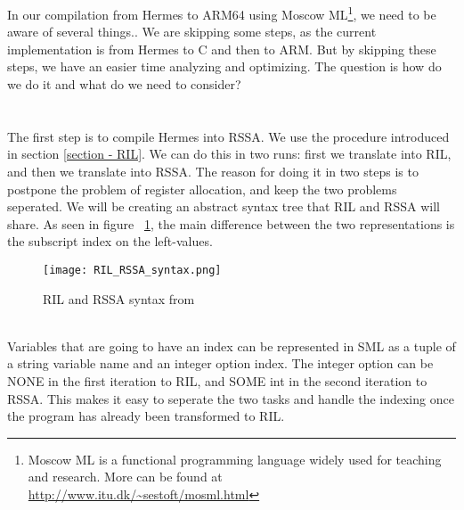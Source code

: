 In our compilation from Hermes to ARM64 using Moscow ML\footnote{Moscow ML is a functional programming language widely used for teaching and research. More can be found at \url{http://www.itu.dk/~sestoft/mosml.html}}, we need to be aware of several things..
We are skipping some steps, as the current implementation is from Hermes to C and then to ARM.
But by skipping these steps, we have an easier time analyzing and optimizing. The question is how do we do it and what do we need to consider?

\section{}
The first step is to compile Hermes into RSSA. We use the procedure introduced in section \ref{section - RIL}.
We can do this in two runs: first we translate into RIL, and then we translate into RSSA.
The reason for doing it in two steps is to postpone the problem of register allocation, and keep the two problems seperated.
We will be creating an abstract syntax tree that RIL and RSSA will share.
As seen in figure ~\ref{fig:RIL vs RSSA}, the main difference between the two representations is the subscript index on the left-values.
\begin{figure}[htp]
  \begin{center}
    \texttt{[image: RIL\_RSSA\_syntax.png]}
  \end{center}
  \caption[caption]{RIL and RSSA syntax from\cite{10.1007/978-3-319-41579-6_16}}
  \label{fig:RIL vs RSSA}
\end{figure} \\
Variables that are going to have an index can be represented in SML as a tuple of a string variable name and an integer option index. The integer option can be NONE in the first iteration to RIL, and SOME int in the second iteration to RSSA. This makes it easy to seperate the two tasks and handle the indexing once the program has already been transformed to RIL.

